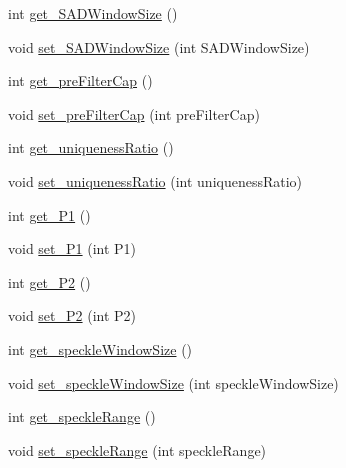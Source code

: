 \begin{DoxyCompactItemize}
\item 
int \mbox{\hyperlink{classorg_1_1opencv_1_1calib3d_1_1_stereo_s_g_b_m_ac781b9ec61f0a2d6f2bde6fd51455c25}{get\+\_\+\+S\+A\+D\+Window\+Size}} ()
\item 
void \mbox{\hyperlink{classorg_1_1opencv_1_1calib3d_1_1_stereo_s_g_b_m_aed4941efcf1913bb2a0626256cfb5fd8}{set\+\_\+\+S\+A\+D\+Window\+Size}} (int S\+A\+D\+Window\+Size)
\item 
int \mbox{\hyperlink{classorg_1_1opencv_1_1calib3d_1_1_stereo_s_g_b_m_a3db0871317e64fbabbc8b952b63d2b44}{get\+\_\+pre\+Filter\+Cap}} ()
\item 
void \mbox{\hyperlink{classorg_1_1opencv_1_1calib3d_1_1_stereo_s_g_b_m_a6ad62e20d014d21ff552f607c122d0e1}{set\+\_\+pre\+Filter\+Cap}} (int pre\+Filter\+Cap)
\item 
int \mbox{\hyperlink{classorg_1_1opencv_1_1calib3d_1_1_stereo_s_g_b_m_a232cc5a659e2fa97f1f6497b5efa16b8}{get\+\_\+uniqueness\+Ratio}} ()
\item 
void \mbox{\hyperlink{classorg_1_1opencv_1_1calib3d_1_1_stereo_s_g_b_m_a2624c4b0a6525f0fb4f3d11e10c3d81d}{set\+\_\+uniqueness\+Ratio}} (int uniqueness\+Ratio)
\item 
int \mbox{\hyperlink{classorg_1_1opencv_1_1calib3d_1_1_stereo_s_g_b_m_a2c2ac11cfe846b603d181ed9856f7928}{get\+\_\+\+P1}} ()
\item 
void \mbox{\hyperlink{classorg_1_1opencv_1_1calib3d_1_1_stereo_s_g_b_m_ad4d27232a092d227d29814de206fb1a3}{set\+\_\+\+P1}} (int P1)
\item 
int \mbox{\hyperlink{classorg_1_1opencv_1_1calib3d_1_1_stereo_s_g_b_m_a46698aae90475e174a5196fb06b87fef}{get\+\_\+\+P2}} ()
\item 
void \mbox{\hyperlink{classorg_1_1opencv_1_1calib3d_1_1_stereo_s_g_b_m_a838d2d569c7ede07207252cbe61d33aa}{set\+\_\+\+P2}} (int P2)
\item 
int \mbox{\hyperlink{classorg_1_1opencv_1_1calib3d_1_1_stereo_s_g_b_m_a4b9fd35a165cae278162fe023f36b663}{get\+\_\+speckle\+Window\+Size}} ()
\item 
void \mbox{\hyperlink{classorg_1_1opencv_1_1calib3d_1_1_stereo_s_g_b_m_a0e973fc231660100eb4d41112bfa0047}{set\+\_\+speckle\+Window\+Size}} (int speckle\+Window\+Size)
\item 
int \mbox{\hyperlink{classorg_1_1opencv_1_1calib3d_1_1_stereo_s_g_b_m_a1534fefd358802d4cf2b8fc875c2a689}{get\+\_\+speckle\+Range}} ()
\item 
void \mbox{\hyperlink{classorg_1_1opencv_1_1calib3d_1_1_stereo_s_g_b_m_ad583c199fadb89ae0dbfc70125621067}{set\+\_\+speckle\+Range}} (int speckle\+Range)

\end{DoxyCompactItemize}
